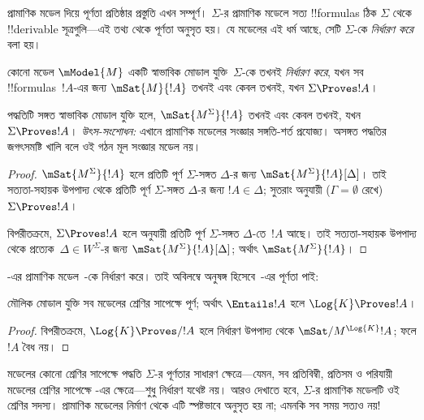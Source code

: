 \documentclass[../../../include/open-logic-section]{subfiles}
\begin{document}


প্রামাণিক মডেল দিয়ে পূর্ণতা প্রতিষ্ঠার প্রস্তুতি এখন সম্পূর্ণ। $\Sigma$-র প্রামাণিক মডেলে সত্য !!{formula}s ঠিক $\Sigma$ থেকে !!{derivable} সূত্রগুলি—এই তথ্য থেকে পূর্ণতা অনুসৃত হয়। যে মডেলের এই ধর্ম আছে, সেটি $\Sigma$-কে \emph{নির্ধারণ করে} বলা হয়।

\begin{defn}
  কোনো মডেল $\mModel{M}$ একটি স্বাভাবিক মোডাল যুক্তি~$\Sigma$-কে তখনই \emph{নির্ধারণ করে}, যখন সব !!{formula}s~$!A$-এর জন্য $\mSat{M}{!A}$ তখনই এবং কেবল তখনই, যখন $\Sigma
  \Proves !A$।
\end{defn}

\begin{thm}[নির্ধারণ]
   পদ্ধতিটি সঙ্গত স্বাভাবিক মোডাল যুক্তি হলে,
   $\mSat{M^\Sigma}{!A}$ তখনই এবং কেবল তখনই, যখন $\Sigma \Proves !A$।
   \emph{উৎস-সংশোধন:} এখানে প্রামাণিক মডেলের সংজ্ঞার সঙ্গতি-শর্ত প্রযোজ্য। অসঙ্গত পদ্ধতির জগৎসমষ্টি খালি বলে ওই গঠন মূল সংজ্ঞার মডেল নয়।
   \end{thm}

\begin{proof}
  $\mSat{M^\Sigma}{!A}$ হলে প্রতিটি পূর্ণ $\Sigma$-সঙ্গত $\Delta$-র জন্য $\mSat{M^\Sigma}{!A}[\Delta]$। তাই সত্যতা-সহায়ক উপপাদ্য থেকে প্রতিটি পূর্ণ $\Sigma$-সঙ্গত $\Delta$-র জন্য $!A \in
  \Delta$; সুতরাং  অনুযায়ী ($\Gamma =
  \emptyset$ রেখে) $\Sigma \Proves !A$।

  বিপরীতক্রমে, $\Sigma \Proves !A$ হলে
   অনুযায়ী প্রতিটি পূর্ণ $\Sigma$-সঙ্গত $\Delta$-তে~$!A$ আছে। তাই সত্যতা-সহায়ক উপপাদ্য থেকে প্রত্যেক~$\Delta \in
  W^\Sigma$-র জন্য $\mSat{M^\Sigma}{!A}[\Delta]$; অর্থাৎ $\mSat{M^\Sigma}{!A}$।
\end{proof}

-এর প্রামাণিক মডেল~-কে নির্ধারণ করে। তাই অবিলম্বে অনুষঙ্গ হিসেবে~-এর পূর্ণতা পাই:

\begin{cor}
  মৌলিক মোডাল যুক্তি  সব মডেলের শ্রেণির সাপেক্ষে পূর্ণ; অর্থাৎ $\Entails !A$ হলে $\Log{K}
  \Proves !A$।
\end{cor}

\begin{proof}
  বিপরীতক্রমে, $\Log{K} \Proves/ !A$ হলে নির্ধারণ উপপাদ্য থেকে $\mSat/{M^{\Log{K}}}{!A}$; ফলে $!A$ বৈধ নয়।
\end{proof}

মডেলের কোনো শ্রেণির সাপেক্ষে পদ্ধতি $\Sigma$-র পূর্ণতার সাধারণ ক্ষেত্রে—যেমন, সব প্রতিবিম্বী, প্রতিসম ও পরিযায়ী মডেলের শ্রেণির সাপেক্ষে -এর ক্ষেত্রে—শুধু নির্ধারণ যথেষ্ট নয়। আরও দেখাতে হবে, $\Sigma$-র প্রামাণিক মডেলটি ওই শ্রেণির সদস্য। প্রামাণিক মডেলের নির্মাণ থেকে এটি স্পষ্টভাবে অনুসৃত হয় না; এমনকি সব সময় সত্যও নয়!
\end{document}
